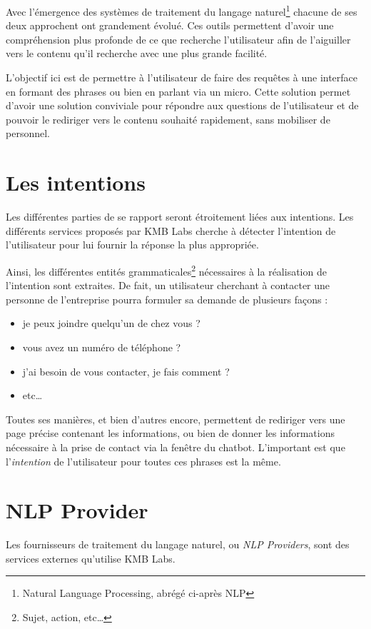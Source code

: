 \documentclass[12pt,a4paper,oneside]{scrreprt}
\begin{document}
Avec l'émergence des systèmes de traitement du langage naturel\footnote{Natural Language Processing, abrégé ci-après NLP} chacune de ses deux approchent ont grandement évolué. Ces outils permettent d'avoir une compréhension plus profonde de ce que recherche l'utilisateur afin de l'aiguiller vers le contenu qu'il recherche avec une plus grande facilité.

L'objectif ici est de permettre à l'utilisateur de faire des requêtes à une interface en formant des phrases ou bien en parlant via un micro. Cette solution permet d'avoir une solution conviviale pour répondre aux questions de l'utilisateur et de pouvoir le rediriger vers le contenu souhaité rapidement, sans mobiliser de personnel.

\section{Les intentions}

Les différentes parties de se rapport seront étroitement liées aux intentions. Les différents services proposés par KMB Labs cherche à détecter l'intention de l'utilisateur pour lui fournir la réponse la plus appropriée.

Ainsi, les différentes entités grammaticales\footnote{Sujet, action, etc\dots} nécessaires à la réalisation de l'intention sont extraites. De fait, un utilisateur cherchant à contacter une personne de l'entreprise pourra formuler sa demande de plusieurs façons :
\begin{itemize}
	\item \og je peux joindre quelqu'un de chez vous ?\fg{}
	\item \og vous avez un numéro de téléphone ?\fg{}
	\item \og j'ai besoin de vous contacter, je fais comment ?\fg{}
	\item etc\dots
\end{itemize}

Toutes ses manières, et bien d'autres encore, permettent de rediriger vers une page précise contenant les informations, ou bien de donner les informations nécessaire à la prise de contact via la fenêtre du chatbot. L'important est que l'\textit{intention} de l'utilisateur pour toutes ces phrases est la même.

\section{NLP Provider}

Les fournisseurs de traitement du langage naturel, ou \textit{NLP Providers}, sont des services externes qu'utilise KMB Labs.
\end{document}
